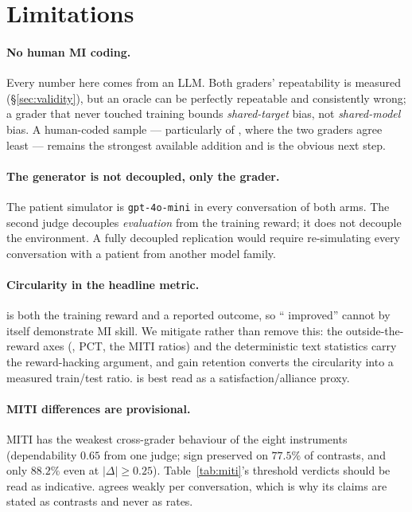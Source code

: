 \section*{Limitations}
\label{sec:limitations}

\paragraph{No human MI coding.}
Every number here comes from an LLM. Both graders' repeatability is measured
(\S\ref{sec:validity}), but an oracle can be perfectly repeatable and consistently wrong; a
grader that never touched training bounds \emph{shared-target} bias, not \emph{shared-model}
bias. A human-coded sample --- particularly of \mici{}, where the two graders agree least
--- remains the strongest available addition and is the obvious next step.

\paragraph{The generator is not decoupled, only the grader.}
The patient simulator is \texttt{gpt-4o-mini} in every conversation of both arms. The second
judge decouples \emph{evaluation} from the training reward; it does not decouple the
environment. A fully decoupled replication would require re-simulating every conversation
with a patient from another model family.

\paragraph{Circularity in the headline metric.}
\QQ{} is both the training reward and a reported outcome, so ``\QQ{} improved'' cannot by
itself demonstrate MI skill. We mitigate rather than remove this: the outside-the-reward
axes (\mici{}, PCT, the MITI ratios) and the deterministic text statistics carry the
reward-hacking argument, and gain retention converts the circularity into a measured
train/test ratio. \QQ{} is best read as a satisfaction/alliance proxy.

\paragraph{MITI differences are provisional.}
MITI has the weakest cross-grader behaviour of the eight instruments (dependability $0.65$
from one judge; sign preserved on $77.5\%$ of contrasts, and only $88.2\%$ even at
$|\Delta|\!\ge\!0.25$). Table~\ref{tab:miti}'s threshold verdicts should be read as
indicative. \mici{} agrees weakly per conversation, which is why its claims are stated as
contrasts and never as rates.

